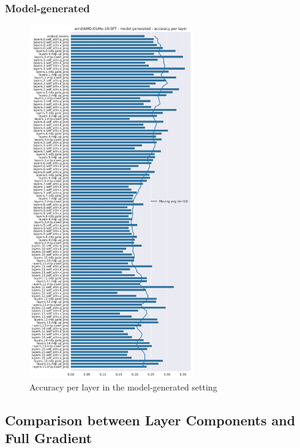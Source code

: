 \subsubsection{Model-generated}
\begin{figure}[ht]
    \centering
    \includegraphics[width=0.63\textwidth]{figures/results/model-generated/accuracy_per_layer.png}
    \caption{Accuracy per layer in the model-generated setting}
    \label{fig:model_generated_accuracy_per_layer}
\end{figure}

\subsection{Comparison between Layer Components and Full Gradient}

